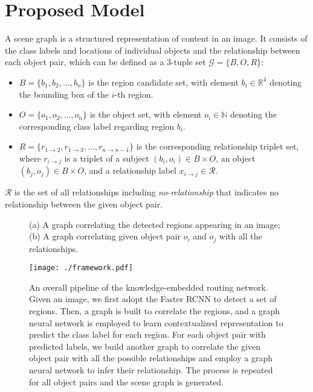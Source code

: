 \documentclass[10pt,twocolumn,letterpaper]{article}
\begin{document}
\section{Proposed Model}
A scene graph is a structured representation of content in an image. It consists of the class labels and locations of individual objects and the relationship between each object pair, which can be defined as a 3-tuple set $\mathcal{G}=\{B, O, R\}$:
\begin{itemize}
  \item $B=\{b_1, b_2, \dots, b_n\}$ is the region candidate set, with element $b_i \in \mathbb{R}^4$ denoting the bounding box of the $i$-th region.  
  \item $O=\{o_1, o_2, \dots, o_n\}$ is the object set, with element $o_i \in \mathbb{N}$ denoting the corresponding class label regarding region $b_i$. 
  \item $R=\{r_{1\rightarrow 2}, r_{1\rightarrow 3}, \dots, r_{n\rightarrow n-1}\}$ is the corresponding relationship triplet set, where $r_{i \rightarrow j}$ is a triplet of a subject $(b_i, o_i) \in B \times O$, an object $(b_j, o_j) \in B \times O$, and a relationship label $x_{i \rightarrow j} \in \mathcal{R}$.
\end{itemize}
$\mathcal{R}$ is the set of all relationships including \emph{no-relationship} that indicates no relationship between the given object pair.

\begin{figure}[!t]
\centering
{}
\caption{(a) A graph correlating the detected regions appearing in an image; (b) A graph correlating given object pair $o_i$ and $o_j$ with all the relationships.}
\end{figure}

\begin{figure*}[!t]
   \centering
   \texttt{[image: ./framework.pdf]} \caption{An overall pipeline of the knowledge-embedded routing network. Given an image, we first adopt the Faster RCNN to detect a set of regions. Then, a graph is built to correlate the regions, and a graph neural network is employed to learn contextualized representation to predict the class label for each region. For each object pair with predicted labels, we build another graph to correlate the given object pair with all the possible relationships and employ a graph neural network to infer their relationship. The process is repeated for all object pairs and the scene graph is generated.}
   \label{fig:framework}
\end{figure*}
\end{document}

